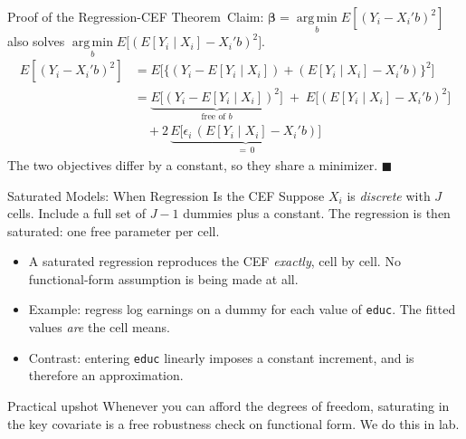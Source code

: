 \documentclass[aspectratio=169,11pt,xcolor=dvipsnames]{beamer}
\DeclareMathOperator*{\argminop}{arg\,min}
\newcommand{\argmin}{\argminop\limits}
\newcommand{\E}{E}
\newcommand{\adv}{\,\raisebox{0.6pt}{\textcolor{accent}{$\bigstar$}}}
\begin{document}
\begin{frame}{Proof of the Regression-CEF Theorem\adv}
Claim: $\bm\beta = \argmin_b \E[(Y_i - X_i'b)^2]$ also solves
$\argmin_b \E\big[(\E[Y_i\mid X_i] - X_i'b)^2\big]$.
\begin{align*}
  \E[(Y_i - X_i'b)^2]
  &= \E\Big[\big\{ (Y_i - \E[Y_i\mid X_i]) + (\E[Y_i\mid X_i] - X_i'b)\big\}^2 \Big] \\
  &= \underbrace{\E\big[(Y_i - \E[Y_i\mid X_i])^2\big]}_{\text{free of } b}
  \;+\; \E\big[(\E[Y_i\mid X_i] - X_i'b)^2\big] \\
  &\quad + 2\,\underbrace{\E\big[\epsilon_i\,(\E[Y_i\mid X_i] - X_i'b)\big]}_{=\,0}
\end{align*}
The two objectives differ by a constant, so they share a minimizer.
$\blacksquare$
\end{frame}

\begin{frame}{Saturated Models: When Regression Is the CEF}
Suppose $X_i$ is \emph{discrete} with $J$ cells. Include a full set of $J-1$
dummies plus a constant. The regression is then \alert{saturated}: one free
parameter per cell.
\vskip6pt
\begin{itemize}\itemsep4pt
  \item A saturated regression reproduces the CEF \emph{exactly}, cell by cell.
        No functional-form assumption is being made at all.
  \item Example: regress log earnings on a dummy for each value of \texttt{educ}.
        The fitted values \emph{are} the cell means.
  \item Contrast: entering \texttt{educ} linearly imposes a constant increment,
        and is therefore an approximation.
\end{itemize}
\vskip4pt
\begin{block}{Practical upshot}
Whenever you can afford the degrees of freedom, saturating in the key covariate
is a free robustness check on functional form. We do this in lab.
\end{block}
\end{frame}
\end{document}
